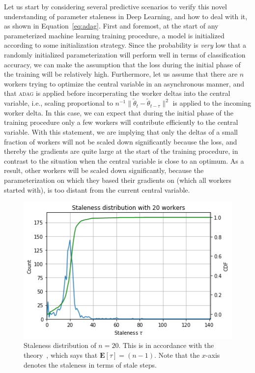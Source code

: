 Let us start by considering several predictive scenarios to verify this novel understanding of parameter staleness in Deep Learning, and how to deal with it, as shown in Equation~\ref{eq:adag}. First and foremost, at the start of any parameterized machine learning training procedure, a model is initialized according to some initialization strategy. Since the probability is \emph{very} low that a randomly initialized parameterization will perform well in terms of classification accuracy, we can make the assumption that the loss during the initial phase of the training will be relatively high. Furthermore, let us assume that there are $n$ workers trying to optimize the central variable in an asynchronous manner, and that \textsc{adag} is applied before incorperating the worker deltas into the central variable, i.e., scaling proportional to $n^{-1}\|\tilde{\theta}_t - \tilde{\theta}_{t - \tau}\|^2$ is applied to the incoming worker delta. In this case, we can expect that during the initial phase of the training procedure only a few workers will contribute efficiently to the central variable. With this statement, we are implying that only the deltas of a small fraction of workers will not be scaled down significantly because the loss, and thereby the gradients are quite large at the start of the training procedure, in contrast to the situation when the central variable is close to an optimum. As a result, other workers will be scaled down significantly, because the parameterization on which they based their gradients on (which all workers started with), is too distant from the current central variable.

\begin{figure}[H]
  \centering
  \includegraphics[width=.4\textwidth]{resources/images/plots/adag_agn_mnist/epoch_40/15/000000001/staleness_distribution}
  \caption{Staleness distribution of $n = 20$. This is in accordance with the theory~\cite{implicitmomentum}, which says that $\mathbf{E}[\tau] = (n - 1)$. Note that the $x$-axis denotes the staleness in terms of stale steps.}
  \label{fig:staleness_increasing}
\end{figure}

